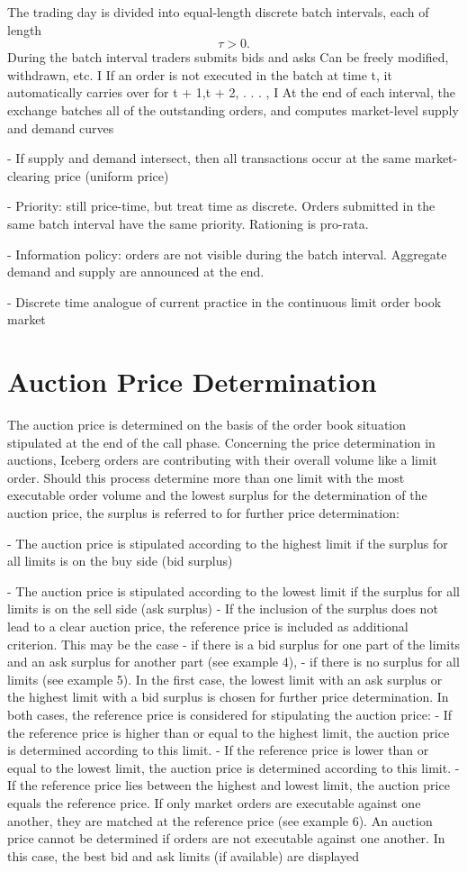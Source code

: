 \documentclass{article}
\begin{document}
The trading day is divided into equal-length discrete batch intervals, each of length 
\[τ > 0.\]
During the batch interval traders submits bids and asks Can be freely modified, withdrawn, etc. I If an order is not executed in the batch at time t, it automatically carries over for t + 1,t + 2, . . . , I At the end of each interval, the exchange batches all of the outstanding orders, and computes market-level supply and demand curves

- If supply and demand intersect, then all transactions occur at the same market-clearing price (uniform price)

- Priority: still price-time, but treat time as discrete. Orders submitted in the same batch interval have the same priority. Rationing is pro-rata.

- Information policy: orders are not visible during the batch interval. Aggregate demand and supply are announced at the end.

- Discrete time analogue of current practice in the continuous limit order book market


\section{Auction Price Determination}

The auction price is determined on the basis of the order book situation stipulated at the end of the call
phase. Concerning the price determination in auctions, Iceberg orders are contributing with their overall
volume like a limit order. Should this process determine more than one limit with the most executable order
volume and the lowest surplus for the determination of the auction price, the surplus is referred to for further
price determination:

- The auction price is stipulated according to the highest limit if the surplus for all limits is on the buy side
(bid surplus)

- The auction price is stipulated according to the lowest limit if the surplus for all limits is on the sell side
(ask surplus) 
- If the inclusion of the surplus does not lead to a clear auction price, the reference price is included as
additional criterion. This may be the case
- if there is a bid surplus for one part of the limits and an ask surplus for another part (see example 4),
- if there is no surplus for all limits (see example 5).
In the first case, the lowest limit with an ask surplus or the highest limit with a bid surplus is chosen for
further price determination.
In both cases, the reference price is considered for stipulating the auction price:
- If the reference price is higher than or equal to the highest limit, the auction price is determined
according to this limit.
- If the reference price is lower than or equal to the lowest limit, the auction price is determined according
to this limit.
- If the reference price lies between the highest and lowest limit, the auction price equals the reference
price.
If only market orders are executable against one another, they are matched at the reference price (see
example 6).
An auction price cannot be determined if orders are not executable against one another. In this case, the
best bid and ask limits (if available) are displayed
\end{document}
